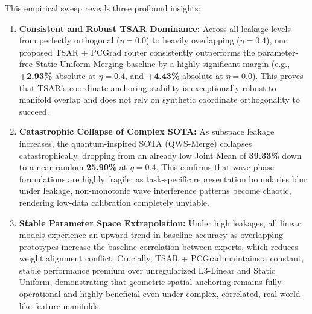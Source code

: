 This empirical sweep reveals three profound insights:
\begin{enumerate}
  \item \textbf{Consistent and Robust TSAR Dominance:} Across all leakage levels from perfectly
orthogonal ($\eta=0.0$) to heavily overlapping ($\eta=0.4$), our proposed TSAR + PCGrad router
consistently outperforms the parameter-free Static Uniform Merging baseline by a highly significant
margin (e.g., \textbf{+2.93\%} absolute at $\eta=0.4$, and \textbf{+4.43\%} absolute at $\eta=0.0$).
This proves that TSAR's coordinate-anchoring stability is exceptionally robust to manifold overlap
and does not rely on synthetic coordinate orthogonality to succeed.
  \item \textbf{Catastrophic Collapse of Complex SOTA:} As subspace leakage increases, the
quantum-inspired SOTA (QWS-Merge) collapses catastrophically, dropping from an already low Joint
Mean of \textbf{39.33\%} down to a near-random \textbf{25.90\%} at $\eta=0.4$. This confirms that
wave phase formulations are highly fragile: as task-specific representation boundaries blur under
leakage, non-monotonic wave interference patterns become chaotic, rendering low-data calibration
completely unviable.
  \item \textbf{Stable Parameter Space Extrapolation:} Under high leakages, all linear models
experience an upward trend in baseline accuracy as overlapping prototypes increase the baseline
correlation between experts, which reduces weight alignment conflict. Crucially, TSAR + PCGrad
maintains a constant, stable performance premium over unregularized L3-Linear and Static Uniform,
demonstrating that geometric spatial anchoring remains fully operational and highly beneficial even
under complex, correlated, real-world-like feature manifolds.
\end{enumerate}